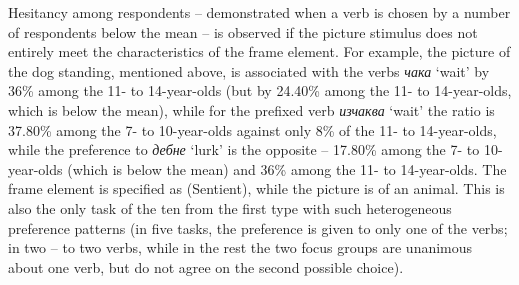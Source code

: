 \documentclass[output=paper,colorlinks,citecolor=brown]{langscibook}
\begin{document}
Hesitancy among respondents -- demonstrated when a verb is chosen by a number of respondents below the mean -- is observed if the picture stimulus does not entirely meet the characteristics of the frame element. For example, the picture of the dog standing, mentioned above, is associated with the verbs \textit{чака} `wait' by 36\% among the 11- to 14-year-olds (but by 24.40\% among the 11- to 14-year-olds, which is below the mean), while for the prefixed verb \textit{изчаква} `wait' the ratio is 37.80\% among the 7- to 10-year-olds against only 8\% of the 11- to 14-year-olds, while the preference to \textit{дебне} `lurk' is the opposite -- 17.80\% among the 7- to 10-year-olds (which is below the mean) and 36\% among the 11- to 14-year-olds. The frame element  is specified as (Sentient), while the picture is of an animal. This is also the only task of the ten from the first type with such heterogeneous preference patterns (in five tasks, the preference is given to only one of the verbs; in two -- to two verbs, while in the rest the two focus groups are unanimous about one verb, but do not agree on the second possible choice). 
\end{document}
